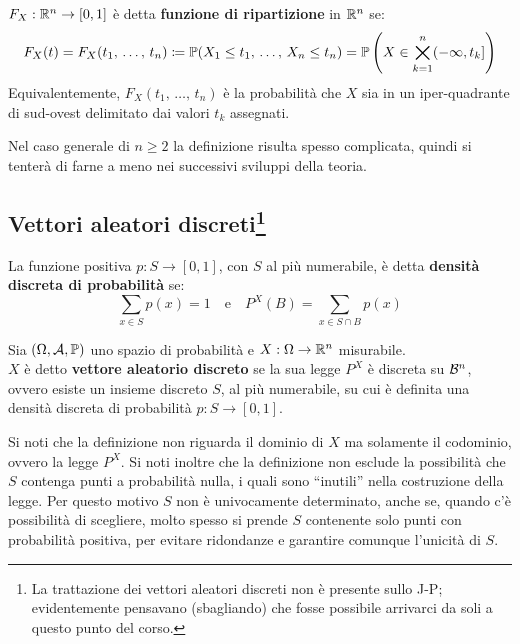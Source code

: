 \medskip
\begin{defn}
  $F_X: \mathbb R^n \to [0,1]$ è detta \textbf{funzione di ripartizione} in $\mathbb R^n$ se:
  $$F_X (t) = F_X(t_1, \, \dots, \, t_n) \coloneqq \mathbb P(X_1 \leq t_1, \, \dots, \, X_n \leq t_n) = \mathbb P \left( X \in \bigtimes_{k=1}^n (-\infty,t_k] \right)$$
  Equivalentemente, $F_X(t_1, \, \dots, \, t_n)$ è la probabilità che $X$ sia in un iper-quadrante di sud-ovest delimitato dai valori $t_k$ assegnati.
\end{defn}
Nel caso generale di $n \geq 2$ la definizione risulta spesso complicata, quindi si tenterà di farne a meno nei successivi sviluppi della teoria.

\subsection[Vettori aleatori discreti]{Vettori aleatori discreti\footnote{La trattazione dei vettori aleatori discreti non è presente sullo J-P; evidentemente pensavano (sbagliando) che fosse possibile arrivarci da soli a questo punto del corso.}}

\begin{defn}
  La funzione positiva $p: S \to [0,1]$, con $S$ al più numerabile,
  è detta \textbf{densità discreta di probabilità} se:
  $$\sum_{x \in S} p(x) = 1 \quad \text{e} \quad P^X(B) = \sum_{x \in S \cap B} p(x)$$
\end{defn}

\begin{defn}
  Sia $(\Omega, \mathcal A, \mathbb P)$ uno spazio di probabilità e $X: \Omega \to \mathbb R^n$ misurabile. \\
  $X$ è detto \textbf{vettore aleatorio discreto} se la sua legge $P^X$ è discreta su $\mathcal B^n$, ovvero
  esiste un insieme discreto $S$, al più numerabile, su cui è definita una
  densità discreta di probabilità $p: S \to [0,1]$.
\end{defn}
Si noti che la definizione non riguarda il dominio di $X$ ma solamente il codominio, ovvero la legge $P^X$. Si noti inoltre che la definizione non esclude la possibilità che $S$ contenga punti a probabilità nulla, i quali sono ``inutili'' nella costruzione della legge. Per questo motivo $S$ non è univocamente determinato, anche se, quando c'è possibilità di scegliere, molto spesso si prende $S$ contenente solo punti con probabilità positiva, per evitare ridondanze e garantire comunque l'unicità di $S$.\\
\vspace{-\baselineskip}


